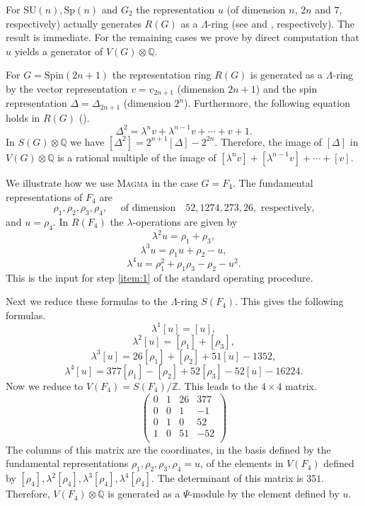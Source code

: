 \documentclass[twoside,a4paper,reqno,11pt]{amsart}
\newcommand{\Q}{\mathbb{Q}}
\newcommand{\Z}{\mathbb{Z}}
\renewcommand{\o}{\otimes}
\newcommand{\SU}{\mathrm{SU}}
\newcommand{\Spin}{\mathrm{Spin}}
\newcommand{\Sp}{\mathrm{Sp}}
\newcommand{\Magma}{\textsc{Magma}}
\begin{document}
For $\SU(n), \Sp(n)$ and $G_2$ the representation $u$ (of dimension $n$, $2n$ and $7$, respectively) actually generates $R(G)$ as a $\Lambda$-ring (see \cite[Theorems~7.4 and 7.6]{MR252560} and \cite[Section~22.3]{MR1153249}, respectively). The result is immediate. For the remaining cases we prove by direct computation that $u$ yields a generator of $V(G)\o\Q$.

For $G = \Spin(2n+1)$ the representation ring $R(G)$ is generated as a $\Lambda$-ring by the vector representation $v = v_{2n+1}$ (dimension $2n+1$) and the spin representation $\Delta = \Delta_{2n+1}$ (dimension $2^n$). Furthermore, the following equation holds in $R(G)$ (\cite[Theorem~10.3]{MR1249482}). 
\[ \Delta^2 = \lambda^n v + \lambda^{n-1} v + \cdots + v + 1. \]
In $S(G) \otimes \Q$ we have $[\Delta^2] = 2^{n+1}[\Delta] - 2^{2n}$. Therefore, the image of $[\Delta]$ in $V(G) \otimes \Q$ is a rational multiple of the image of $[\lambda^n v] + [\lambda^{n-1} v] + \cdots + [v]$. 

We illustrate how we use \Magma{} in the case $G = F_4$. The fundamental representations of $F_4$ are
\[ \rho_1, \rho_2, \rho_3, \rho_4, \quad \text{ of dimension} \quad 52,1274, 273, 26, \text{ respectively,}\]
and $u = \rho_4$. 
In $R(F_4)$ the $\lambda$-operations are given by
\[ \lambda^2 u = \rho_1 + \rho_3,\] 
\[ \lambda^3 u = \rho_1u + \rho_2 - u, \]
\[ \lambda^4 u = \rho_1^2 + \rho_1\rho_3 - \rho_2 - u^2.\]
This is the input for step \ref{item:1} of the standard operating procedure.  

Next we reduce these formulas to the $\Lambda$-ring $S(F_4)$. This gives the following formulas.
\[ \lambda^1[u] = [u],\]
\[\lambda^2[u] = [\rho_1] + [\rho_3],\]
\[\lambda^3[u]  = 26[\rho_1] +[\rho_2] +51[u] - 1352,\]
\[\lambda^4[u] = 377[\rho_1] - [\rho_2] + 52[\rho_3] - 52[u] - 16224.\]
Now we reduce to $V(F_4) = S(F_4)/\Z$.  This leads to the $4\times 4$ matrix.
\[
\begin{pmatrix}
0 & 1& 26 & 377  \\
0 & 0 & 1 & -1  \\
0 & 1 & 0 & 52\\
1 & 0 & 51 & -52 \\
\end{pmatrix}
\]
The columns of this matrix are the coordinates, in the basis defined by the fundamental representations $\rho_1, \rho_2, \rho_3, \rho_4 = u$, of the elements in $V(F_4)$ defined by $[\rho_4], \lambda^2[\rho_4], \lambda^3[\rho_4], \lambda^4[\rho_4]$. The determinant of this matrix is $351$. Therefore, $V(F_4)\o\Q$ is generated as a $\Psi$-module by the element defined by $u$.  
\end{document}
